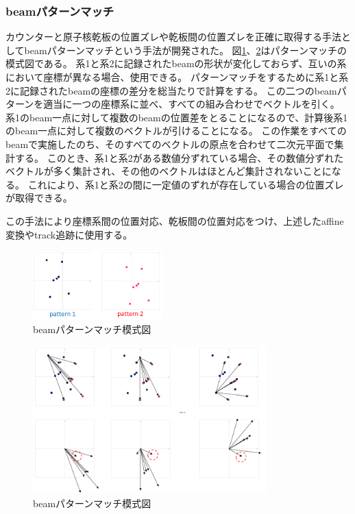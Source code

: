 \documentclass[12pt,a4paper]{jarticle}
\begin{document}
\subsubsection{beamパターンマッチ}
カウンターと原子核乾板の位置ズレや乾板間の位置ズレを正確に取得する手法としてbeamパターンマッチという手法が開発された。
\cite{daisuke}
図\ref{fig:beam_mosikizu1}、\ref{fig:beam_mosikizu2}はパターンマッチの模式図である。
系1と系2に記録されたbeamの形状が変化しておらず、互いの系において座標が異なる場合、使用できる。
パターンマッチをするために系1と系2に記録されたbeamの座標の差分を総当たりで計算をする。
この二つのbeamパターンを適当に一つの座標系に並べ、すべての組み合わせでベクトルを引く。
系1のbeam一点に対して複数のbeamの位置差をとることになるので、計算後系1のbeam一点に対して複数のベクトルが引けることになる。
この作業をすべてのbeamで実施したのち、そのすべてのベクトルの原点を合わせて二次元平面で集計する。
このとき、系1と系2がある数値分ずれている場合、その数値分ずれたベクトルが多く集計され、その他のベクトルはほとんど集計されないことになる。
これにより、系1と系2の間に一定値のずれが存在している場合の位置ズレが取得できる。
\par
この手法により座標系間の位置対応、乾板間の位置対応をつけ、上述したaffine変換やtrack追跡に使用する。
\begin{figure}[htbp]
  \centering
     \includegraphics[width=50mm]{beam_pattern1.png}
  \caption{beamパターンマッチ模式図\label{fig:beam_mosikizu1}}
\end{figure}
\begin{figure}[htbp]
  \centering
     \includegraphics[width=90mm]{beam_pattern2.png}
  \caption{beamパターンマッチ模式図\label{fig:beam_mosikizu2}}
\end{figure}
\newpage
\end{document}
